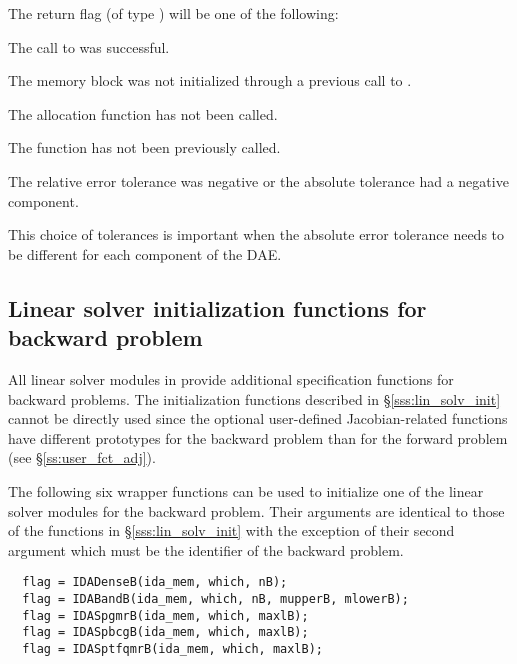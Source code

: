 {
  The return flag  (of type ) will be one of the following:
  \begin{args}
  \item[\Id{IDA\_SUCCESS}]
    The call to  was successful.
  \item[\Id{IDA\_MEM\_NULL}] 
    The {\idas} memory block was not initialized through a previous call to
    .
  \item[\Id{IDA\_NO\_MALLOC}] 
    The allocation function  has not been called.
  \item[\Id{IDA\_NO\_ADJ}]
    The function  has not been previously called.
  \item[\Id{IDA\_ILL\_INPUT}] 
    The relative error tolerance was negative or the absolute tolerance
    had a negative component.
  \end{args}
}
{
  This choice of tolerances is important when the absolute error tolerance needs to
  be different for each component of the DAE. 
}

\subsection{Linear solver initialization functions for backward problem}
\label{sss:lin_solv_b}

All linear solver modules in {\idas} provide additional specification functions 
for backward problems.
The initialization functions described in \S\ref{sss:lin_solv_init} cannot be directly used 
since the optional user-defined Jacobian-related functions have different prototypes for the
backward problem than for the forward problem (see \S\ref{ss:user_fct_adj}).

The following six wrapper functions can be used to initialize one of the linear
solver modules for the backward problem. Their arguments are identical to those
of the functions in \S\ref{sss:lin_solv_init} with the exception of their second
argument which must be the identifier of the backward problem.
\begin{verbatim}
  flag = IDADenseB(ida_mem, which, nB);
  flag = IDABandB(ida_mem, which, nB, mupperB, mlowerB);
  flag = IDASpgmrB(ida_mem, which, maxlB);
  flag = IDASpbcgB(ida_mem, which, maxlB);
  flag = IDASptfqmrB(ida_mem, which, maxlB);
\end{verbatim}

